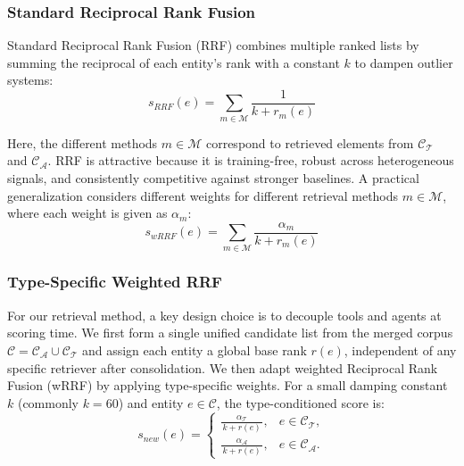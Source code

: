 \documentclass[a4paper,twoside]{article}
\begin{document}
\subsubsection{Standard Reciprocal Rank Fusion}

Standard Reciprocal Rank Fusion (RRF) \cite{36196} combines multiple ranked lists by summing the reciprocal of each entity's rank with a constant \(k\) to dampen outlier systems:
\begin{equation}
 s_{RRF}(e) = \sum_{m \in \mathcal{M}} \frac{1}{k + r_m(e)}    
\end{equation}
 
Here, the different methods \(m \in \mathcal{M}\) correspond to retrieved elements from \(\mathcal{C_T}\) and \(\mathcal{C_A}\). RRF is attractive because it is training-free, robust across heterogeneous signals, and consistently competitive against stronger baselines. A practical generalization considers different weights for different retrieval methods \(m \in \mathcal{M}\), where each weight is given as \(\alpha_m\):
\begin{equation}\label{eq:wRRF}
    s_{wRRF}(e) = \sum_{m \in \mathcal{M}} \frac{\alpha_m}{k + r_m(e)}
\end{equation}



\subsubsection{Type-Specific Weighted RRF}

For our retrieval method, a key design choice is to decouple tools and agents at scoring time. We first form a single unified candidate list from the merged corpus \(\mathcal{C}=\mathcal{C_A}\cup\mathcal{C_T}\) and assign each entity a global base rank \(r(e)\), independent of any specific retriever after consolidation. We then adapt weighted Reciprocal Rank Fusion (wRRF) by applying type-specific weights. For a small damping constant \(k\) (commonly \(k=60\)) and entity \(e\in\mathcal{C}\), the type-conditioned score is:
\begin{equation} \label{eq:ourRRF}
    s_{new}(e)=
        \begin{cases}
        \displaystyle \frac{\alpha_{\mathcal{T}}}{\,k + r(e)\,}, & e \in \mathcal{C_T},\\[8pt]
        \displaystyle \frac{\alpha_{\mathcal{A}}}{\,k + r(e)\,}, & e \in \mathcal{C_A}.
    \end{cases}
\end{equation}
\end{document}
